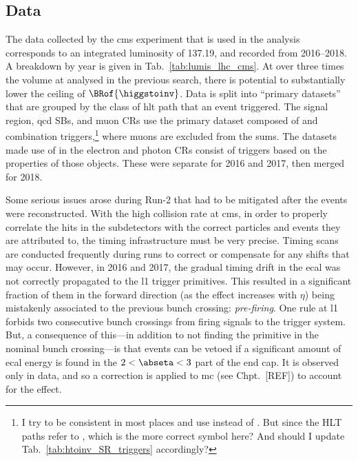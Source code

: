 

\subsection{Data}
\label{subsec:htoinv_data}

The data collected by the \acrshort{cms} experiment that is used in the analysis corresponds to an integrated luminosity of 137.19\fbinv, and recorded from 2016--2018. A breakdown by year is given in Tab.~\ref{tab:lumis_lhc_cms}. At over three times the volume at \comruntwo analysed in the previous search, there is potential to substantially lower the ceiling of $\BRof{\higgstoinv}$. Data is split into ``primary datasets'' that are grouped by the class of \acrshort{hlt} path that an event triggered. The signal region, \acrshort{qcd} \glspl{SB}, and muon \glspl{CR} use the primary dataset composed of \etmiss and \htmiss combination triggers,\footnote{I try to be consistent in most places and use \ptmiss instead of \etmiss. But since the HLT paths refer to \etmiss, which is the more correct symbol here? And should I update Tab.~\ref{tab:htoinv_SR_triggers} accordingly?} where muons are excluded from the sums. The datasets made use of in the electron and photon \glspl{CR} consist of triggers based on the properties of those objects. These were separate for 2016 and 2017, then merged for 2018.

Some serious issues arose during Run-2 that had to be mitigated after the events were reconstructed. With the high collision rate at \acrshort{cms}, in order to properly correlate the hits in the subdetectors with the correct particles and events they are attributed to, the timing infrastructure must be very precise. Timing scans are conducted frequently during runs to correct or compensate for any shifts that may occur. However, in 2016 and 2017, the gradual timing drift in the \acrshort{ecal} was not correctly propagated to the \acrlong{l1} trigger primitives. This resulted in a significant fraction of them in the forward direction (as the effect increases with $\eta$) being mistakenly associated to the previous bunch crossing: \emph{pre-firing}. One rule at \acrlong{l1} forbids two consecutive bunch crossings from firing signals to the trigger system. But, a consequence of this---in addition to not finding the primitive in the nominal bunch crossing---is that events can be vetoed if a significant amount of \acrshort{ecal} energy is found in the $\text{2} < \abseta < \text{3}$ part of the end cap. It is observed only in data, and so a correction is applied to \acrshort{mc} (see Chpt.~[REF]) to account for the effect.

